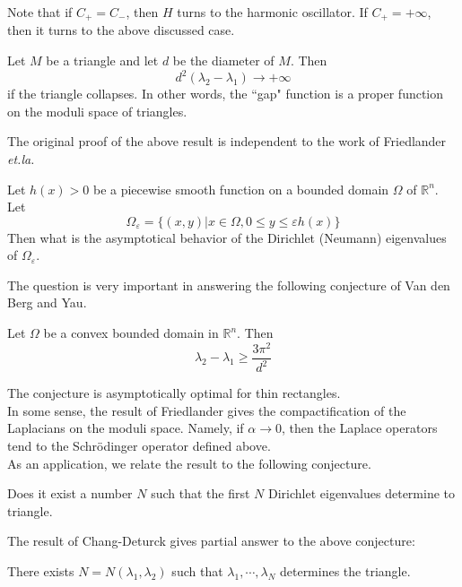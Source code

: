 Note that if $C_+ = C_-$, then $H$ turns to the harmonic oscillator. If
$C_+ = +\infty$, then it turns to the above discussed case.

\begin{theorem}
[Lu-Rowlett] Let $M$ be a triangle and let $d$ be the diameter of $M$. Then
\[
d^2(\lambda_2 - \lambda_1) \rightarrow +\infty
\]
if the triangle collapses. In other words, the ``gap" function is a proper
function on the moduli space of triangles.
\end{theorem}

The original proof of the above result is independent to the work of Friedlander
\textit{et.la.}
\\

\begin{question} Let $h(x) > 0$ be a piecewise smooth function on a bounded
domain $\Omega$ of $\mathbb{R}^n$. Let
\[
\Omega_\varepsilon = \{(x,y)|x\in\Omega, 0\leqslant y\leqslant\varepsilon h(x)\}
\]
Then what is the asymptotical behavior of the Dirichlet (Neumann) eigenvalues of
$\Omega_\varepsilon$.
\end{question}

The question is very important in answering the following conjecture of 
Van den Berg and Yau.
\begin{conjecture}
Let $\Omega$ be a convex bounded domain in $\mathbb{R}^n$. Then
\[
\lambda_2 - \lambda_1 \geqslant \frac{3\pi^2}{d^2}
\]
\end{conjecture}
The conjecture is asymptotically optimal for thin rectangles.
\\

In some sense, the result of Friedlander gives the compactification of the
Laplacians on the moduli space. Namely, if $\alpha\rightarrow 0$, then the
Laplace operators tend to the Schr\"{o}dinger operator defined above.
\\

As an application, we relate the result to the following conjecture.
\begin{conjecture}
Does it exist a number $N$ such that the first $N$ Dirichlet eigenvalues
determine to triangle.
\end{conjecture}

The result of Chang-Deturck gives partial answer to the above conjecture:
\begin{theorem}
There exists $N = N(\lambda_1, \lambda_2)$ such that 
$\lambda_1, \cdots, \lambda_N$ determines the triangle.
\end{theorem}

